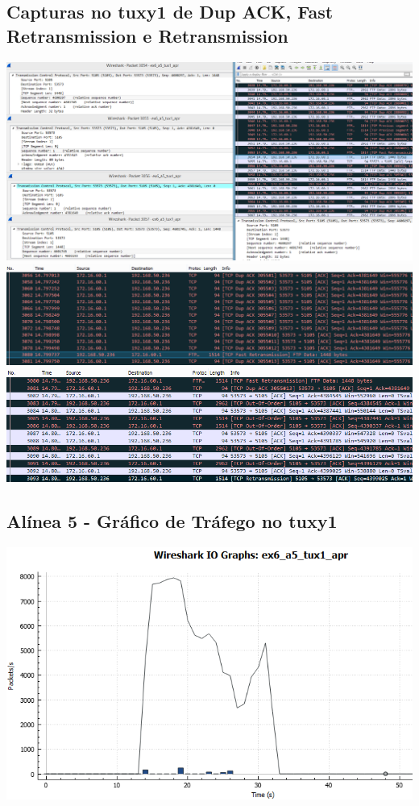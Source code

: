 \documentclass[11pt,a4paper,reqno]{report}
\numberwithin{equation}{section}
\begin{document}
\begin{appendices}
\subsection{Capturas no tuxy1 de Dup ACK, Fast Retransmission e Retransmission}
\label{ex6_retrans}
\includegraphics[width=18cm]{ex6_tux1_3054.png}
\includegraphics[width=18cm]{ex6_tux1_fastretransmission.png}
\includegraphics[width=18cm]{ex6_tux1_retransmission.png}

\subsection{Alínea 5 - Gráfico de Tráfego no tuxy1}
\label{ex6_a5_1io}
\includegraphics[width=18cm]{ex6_a5_tux1_IO.png}

\end{appendices}
\end{document}
